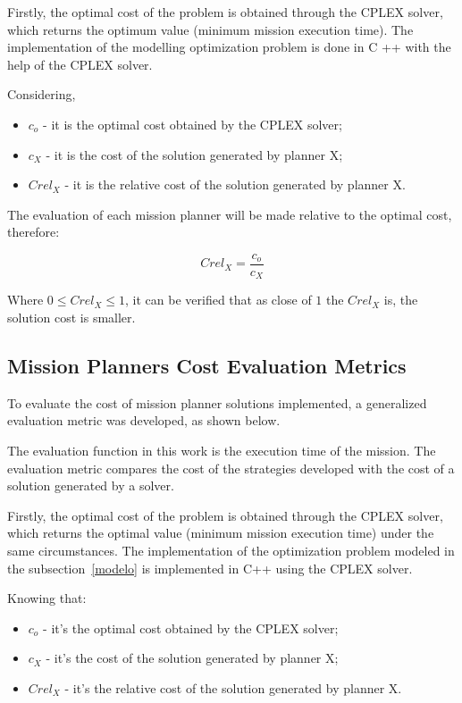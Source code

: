 \documentclass[conference,harvard,brazil,english]{sbatex}
\begin{document}
Firstly, the optimal cost of the problem is obtained through the CPLEX solver, which returns the optimum value (minimum mission execution time). The implementation of the modelling optimization problem is done in C ++ with the help of the CPLEX solver.

Considering,

\begin{itemize}
	\item \textbf{$c_o$} - it is the optimal cost obtained by the CPLEX solver;
	\item \textbf{$c_X$} - it is the cost of the solution generated by planner X;
	\item \textbf{$Crel_X$} - it is the relative cost of the solution generated by planner X.
	\end{itemize}
	
	The evaluation of each mission planner will be made relative to the optimal cost, therefore:
	
	\begin{equation}
Crel_X=\frac{c_o}{c_X}
\end{equation}

Where $0 \leq Crel_X \leq 1$, it can be verified that as close of $1$ the $Crel_X$ is, the solution cost is smaller.

\subsection{Mission Planners Cost Evaluation Metrics}
\label{sec:ac}

To evaluate the cost of mission planner solutions implemented, a generalized evaluation metric was developed, as shown below.

The evaluation function in this work is the execution time of the mission. The evaluation metric compares the cost of the strategies developed with the cost of a solution generated by a solver.

Firstly, the optimal cost of the problem is obtained through the CPLEX solver, which returns the optimal value (minimum mission execution time) under the same circumstances. The implementation of the optimization problem modeled in the subsection~\ref{modelo} is implemented in C++ using the CPLEX solver.

Knowing that:

\begin{itemize}
	\item \textbf{$c_o$} - it's the optimal cost obtained by the CPLEX solver;
	\item \textbf{$c_X$} - it's the cost of the solution generated by planner X;
	\item \textbf{$Crel_X$} - it's the relative cost of the solution generated by planner X.
	\end{itemize}
	
\end{document}
